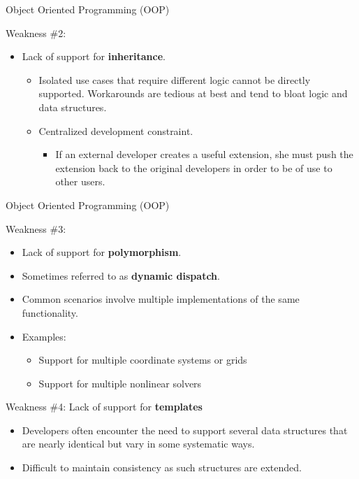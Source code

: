 \documentclass[11pt]{beamer}
\begin{document}

\begin{frame}{Object Oriented Programming (OOP)}

  Weakness \#2:
\begin{itemize}

  \item Lack of support for  \textbf{inheritance}. 
  \begin{itemize}
  \item Isolated use cases that require different logic cannot be directly supported. Workarounds are tedious at best and tend to bloat logic and data structures.
  \item Centralized development constraint.   
  \begin{itemize}
  \item If an external developer creates a useful extension, she must push the extension back to the original developers in order to be of use to other users.
  \end{itemize}
   \end{itemize}

 \end{itemize}

\end{frame}


\begin{frame}{Object Oriented Programming (OOP)}

  Weakness \#3:
\begin{itemize}

  \item Lack of support for  \textbf{polymorphism}. 
  \item Sometimes referred to as \textbf{dynamic dispatch}.
  \item Common scenarios involve multiple implementations of the same functionality.   
  \item Examples:
  \begin{itemize}
  \item Support for multiple coordinate systems or grids
  \item Support for multiple nonlinear solvers
  \end{itemize}
  
 \end{itemize}
  
Weakness \#4: Lack of support for \textbf{templates}
 \begin{itemize}
\item Developers often encounter the need to support several data structures that are nearly identical but vary in some systematic ways.
\item Difficult to maintain consistency as such structures are extended.
 \end{itemize}

\end{frame}
\end{document}
